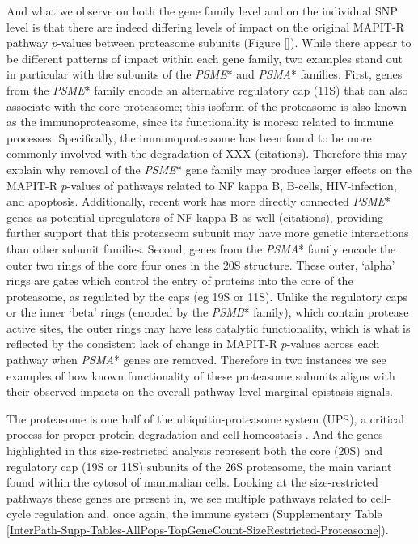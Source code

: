 \documentclass[12pt,a4paper]{article}
\begin{document}
And what we observe on both the gene family level and on the individual SNP level is that there are indeed differing levels of impact on the original MAPIT-R pathway $p$-values between proteasome subunits (Figure \ref{}).
While there appear to be different patterns of impact within each gene family, two examples stand out in particular with the subunits of the \textit{PSME}* and \textit{PSMA}* families. First, genes from the \textit{PSME}* family encode an alternative regulatory cap (11S) that can also associate with the core proteasome; this isoform of the proteasome is also known as the immunoproteasome, since its functionality is moreso related to immune processes. Specifically, the immunoproteasome has been found to be more commonly involved with the degradation of XXX (citations). Therefore this may explain why removal of the \textit{PSME}* gene family may produce larger effects on the MAPIT-R $p$-values of pathways related to NF kappa B, B-cells, HIV-infection, and apoptosis. Additionally, recent work has more directly connected \textit{PSME}* genes as potential upregulators of NF kappa B as well (citations), providing further support that this proteaseom subunit may have more genetic interactions than other subunit families. Second, genes from the \textit{PSMA}* family encode the outer two rings of the core four ones in the 20S structure. These outer, `alpha' rings are gates which control the entry of proteins into the core of the proteasome, as regulated by the caps (eg 19S or 11S). Unlike the regulatory caps or the inner `beta' rings (encoded by the \textit{PSMB}* family), which contain protease active sites, the outer rings may have less catalytic functionality, which is what is reflected by the consistent lack of change in MAPIT-R $p$-values across each pathway when \textit{PSMA}* genes are removed. Therefore in two instances we see examples of how known functionality of these proteasome subunits aligns with their observed impacts on the overall pathway-level marginal epistasis signals.










The proteasome is one half of the ubiquitin-proteasome system (UPS), a critical process for proper protein degradation and cell homeostasis \citep{Voges1999,Livneh2016,Collins2017}. And the genes highlighted in this size-restricted analysis represent both the core (20S) and regulatory cap (19S or 11S) subunits of the 26S proteasome, the main variant found within the cytosol of mammalian cells. Looking at the size-restricted pathways these genes are present in, we see multiple pathways related to cell-cycle regulation and, once again, the immune system (Supplementary Table \ref{InterPath-Supp-Tables-AllPops-TopGeneCount-SizeRestricted-Proteasome}).
\end{document}
